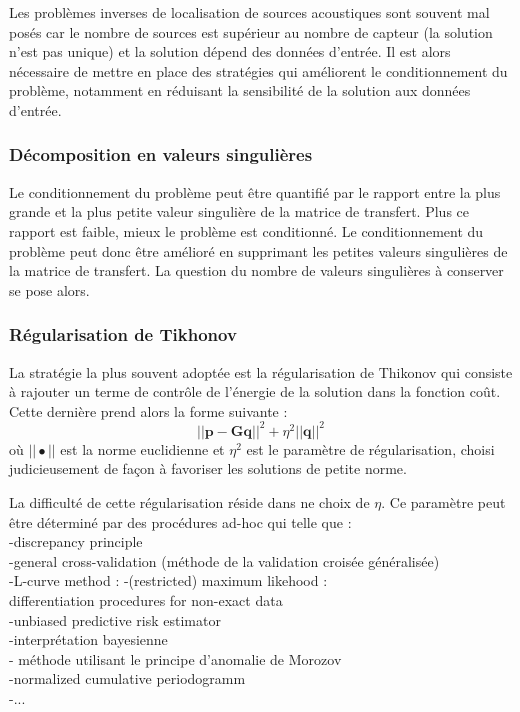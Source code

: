 Les problèmes inverses de localisation de sources acoustiques sont souvent mal posés car le nombre de sources est supérieur au nombre de capteur (la solution n'est pas unique) et la solution dépend des données d'entrée. Il est alors nécessaire de mettre en place des stratégies qui améliorent le conditionnement du problème, notamment en réduisant la sensibilité de la solution aux données d'entrée.\\


\subsubsection{Décomposition en valeurs singulières}


Le conditionnement du problème peut être quantifié par le rapport entre la plus grande et la plus petite valeur singulière de la matrice de transfert. Plus ce rapport est faible, mieux le problème est conditionné. Le conditionnement du problème peut donc être amélioré en supprimant les petites valeurs singulières de la matrice de transfert. La question du nombre de valeurs singulières à conserver se pose alors. 



\subsubsection{Régularisation de Tikhonov}

La stratégie la plus souvent adoptée est la régularisation de Thikonov \citep{Tikhonov1963} qui consiste à rajouter un terme de contrôle de l'énergie de la solution dans la fonction coût. Cette dernière prend alors la forme suivante : 
\begin{equation}
	||\bm{p}-\bm{G}\bm{q}||^2 + \eta^2||\bm{q}||^2
\end{equation}
où $||\bullet||$ est la norme euclidienne et $\eta^2$ est le paramètre de régularisation, choisi judicieusement de façon à favoriser les solutions de petite norme.

La difficulté de cette régularisation réside dans ne choix de $\eta$. Ce paramètre peut être déterminé par des procédures ad-hoc qui telle que : \\
-discrepancy principle\\
-general cross-validation (méthode de la validation croisée généralisée)\\
-L-curve method : %
-(restricted) maximum likehood : \\%
differentiation procedures for non-exact data\\
-unbiased predictive risk estimator\\
-interprétation bayesienne \citep{Pereira2015}\\
- méthode utilisant le principe d’anomalie de Morozov\\
-normalized cumulative periodogramm\\
-...\\

